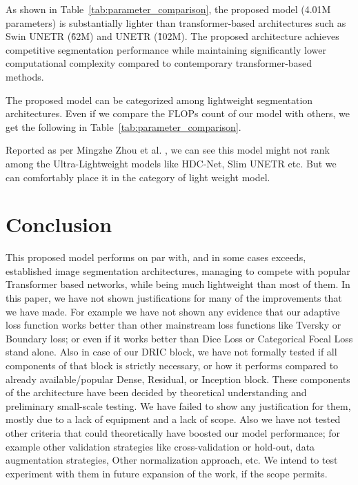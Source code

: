 \documentclass[a4paper,fleqn]{cas-dc}
\begin{document}
As shown in Table~\ref{tab:parameter_comparison}, the proposed model (4.01M parameters) is substantially lighter than transformer-based architectures such as Swin UNETR (\~62M) and UNETR (\~102M). The proposed architecture achieves competitive segmentation performance while maintaining significantly lower computational complexity compared to contemporary transformer-based methods.

{\sloppy The proposed model can be categorized among lightweight segmentation architectures. Even if we compare the FLOPs count of our model with others, we get the following in Table~\ref{tab:parameter_comparison}.\par}



Reported as per Mingzhe Zhou et al. \cite{zhou2025mcslf}, we can see this model might not rank among the Ultra-Lightweight models like HDC-Net, Slim UNETR\cite{SlimUNETR} etc. But we can comfortably place it in the category of light weight model.



\section{Conclusion}

{\sloppy This proposed model performs on par with, and in some cases exceeds, established image segmentation architectures, managing to compete with popular Transformer based networks, while being much lightweight than most of them. In this paper, we have not shown justifications for many of the improvements that we have made. For example we have not shown any evidence that our adaptive loss function works better than other mainstream loss functions like Tversky or Boundary loss; or even if it works better than Dice Loss or Categorical Focal Loss stand alone. Also in case of our DRIC block, we have not formally tested if all components of that block is strictly necessary, or how it performs compared to already available/popular Dense, Residual, or Inception block. These components of  the architecture have been decided by theoretical understanding and preliminary small-scale testing. We have failed to show any justification for them, mostly due to a lack of equipment and a lack of scope. Also we have not tested other criteria that could theoretically have boosted our model performance; for example other validation strategies like cross-validation or hold-out, data augmentation strategies, Other normalization approach, etc. We intend to test experiment with them in future expansion of the work, if the scope permits.\par}
\end{document}
